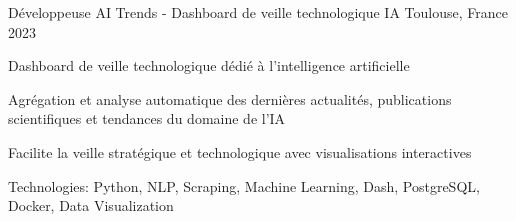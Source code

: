 \begin{cventries}

\cventry
{Développeuse} %
{AI Trends - Dashboard de veille technologique IA} %
{Toulouse, France} %
{2023} %
{ %
\begin{cvitems}
\item {Dashboard de veille technologique dédié à l'intelligence artificielle}
\item {Agrégation et analyse automatique des dernières actualités, publications scientifiques et tendances du domaine de l'IA}
\item {Facilite la veille stratégique et technologique avec visualisations interactives}
\item {Technologies: Python, NLP, Scraping, Machine Learning, Dash, PostgreSQL, Docker, Data Visualization}
\end{cvitems}
}


\end{cventries}